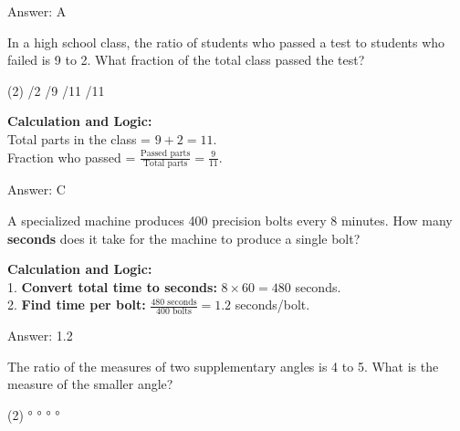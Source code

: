 \documentclass[11pt,paper=a4,answers]{exam}
\begin{document}
\begin{questions}
\begin{solution}
\vspace{30pt}

Answer: \colorbox{yellow!100}{A}
\end{solution}

\vspace{60pt}

\question
In a high school class, the ratio of students who passed a test to students who failed is 9 to 2. What fraction of the total class passed the test?
\begin{tasks}(2)
    /2
    /9
    /11
    /11
\end{tasks}

\begin{solution}
\textbf{Calculation and Logic:} \\
Total parts in the class = $9 + 2 = 11$. \\
Fraction who passed = $\frac{\text{Passed parts}}{\text{Total parts}} = \frac{9}{11}$.

\vspace{30pt}

Answer: \colorbox{yellow!100}{C}
\end{solution}

\vspace{60pt}

\question
A specialized machine produces 400 precision bolts every 8 minutes. How many \textbf{seconds} does it take for the machine to produce a single bolt?

\begin{solution}
\textbf{Calculation and Logic:} \\
1. \textbf{Convert total time to seconds:} $8 \times 60 = 480$ seconds. \\
2. \textbf{Find time per bolt:} $\frac{480 \text{ seconds}}{400 \text{ bolts}} = 1.2$ seconds/bolt.

\vspace{30pt}

Answer: \colorbox{yellow!100}{1.2}
\end{solution}

\vspace{60pt}

\question
The ratio of the measures of two supplementary angles is 4 to 5. What is the measure of the smaller angle?
\begin{tasks}(2)
    °
    °
    °
    °
\end{tasks}


\end{questions}
\end{document}
